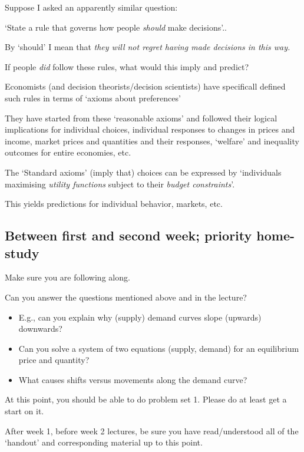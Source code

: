 \documentclass[]{article}
\begin{document}
Suppose I asked an apparently similar question:

`State a rule that governs how people \emph{should} make decisions'..

By `should' I mean that \emph{they will not regret having made decisions
in this way.}

\bigskip

If people \emph{did} follow these rules, what would this imply and
predict?

Economists (and decision theorists/decision scientists) have specificall
defined such rules in terms of `axioms about preferences'

They have started from these `reasonable axioms' and followed their
logical implications for individual choices, individual responses to
changes in prices and income, market prices and quantities and their
responses, `welfare' and inequality outcomes for entire economies, etc.

The `Standard axioms' (imply that) choices can be expressed by
`individuals maximising \emph{utility functions} subject to their
\emph{budget constraints}'.

This yields predictions for individual behavior, markets, etc.

\hypertarget{between-first-and-second-week-priority-home-study}{%
\subsection{Between first and second week; priority
home-study}\label{between-first-and-second-week-priority-home-study}}

Make sure you are following along.

Can you answer the questions mentioned above and in the lecture?

\begin{itemize}
\item
  E.g., can you explain why (supply) demand curves slope (upwards)
  downwards?
\item
  Can you solve a system of two equations (supply, demand) for an
  equilibrium price and quantity?
\item
  What causes shifts versus movements along the demand curve?
\end{itemize}

At this point, you should be able to do problem set 1. Please do at
least get a start on it.

After week 1, before week 2 lectures, be sure you have read/understood
all of the `handout' and corresponding material up to this point.
\end{document}
